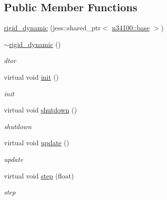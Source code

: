 \subsection*{Public Member Functions}
\begin{DoxyCompactItemize}
\item 
\hyperlink{classnebula_1_1content_1_1actor_1_1physics_1_1rigid__dynamic_ae5ab0e6f758657ff8efd4725b3dca453}{rigid\_\-dynamic} (jess::shared\_\-ptr$<$ \hyperlink{classnebula_1_1content_1_1actor_1_1admin_1_1base}{n34100::base} $>$)
\item 
\hyperlink{classnebula_1_1content_1_1actor_1_1physics_1_1rigid__dynamic_a34b5069d0913feb258ba55c4bb4196de}{$\sim$rigid\_\-dynamic} ()
\begin{DoxyCompactList}\small\item\em dtor \item\end{DoxyCompactList}\item 
virtual void \hyperlink{classnebula_1_1content_1_1actor_1_1physics_1_1rigid__dynamic_ae9450372c5f60103573ed626ffda9532}{init} ()
\begin{DoxyCompactList}\small\item\em init \item\end{DoxyCompactList}\item 
virtual void \hyperlink{classnebula_1_1content_1_1actor_1_1physics_1_1rigid__dynamic_a712d45c781944f79af0d074062674e20}{shutdown} ()
\begin{DoxyCompactList}\small\item\em shutdown \item\end{DoxyCompactList}\item 
virtual void \hyperlink{classnebula_1_1content_1_1actor_1_1physics_1_1rigid__dynamic_a37baf9ed4986782294789073ebb05f19}{update} ()
\begin{DoxyCompactList}\small\item\em update \item\end{DoxyCompactList}\item 
virtual void \hyperlink{classnebula_1_1content_1_1actor_1_1physics_1_1rigid__dynamic_a23e957b179440185cfc15750b47f3a5c}{step} (float)
\begin{DoxyCompactList}\small\item\em step \item\end{DoxyCompactList}\item 

\end{DoxyCompactItemize}
